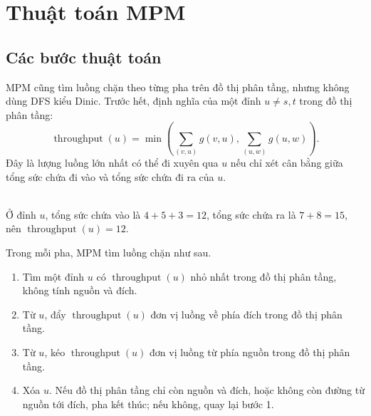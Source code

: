 \documentclass[11pt]{article}
\newcommand{\throughput}{\operatorname{throughput}}
\begin{document}
\section{Thuật toán MPM}

\subsection{Các bước thuật toán}

MPM cũng tìm luồng chặn theo từng pha trên đồ thị phân tầng, nhưng không dùng
DFS kiểu Dinic. Trước hết, định nghĩa  của một đỉnh
\(u\ne s,t\) trong đồ thị phân tầng:
\[
  \throughput(u)=
  \min\left(
    \sum_{(v,u)} g(v,u),
    \sum_{(u,w)} g(u,w)
  \right).
\]
Đây là lượng luồng lớn nhất có thể đi xuyên qua \(u\) nếu chỉ xét cân bằng
giữa tổng sức chứa đi vào và tổng sức chứa đi ra của \(u\).

\begin{center}
\\
\small Ở đỉnh \(u\), tổng sức chứa vào là \(4+5+3=12\), tổng sức chứa ra là
\(7+8=15\), nên \(\throughput(u)=12\).
\end{center}

Trong mỗi pha, MPM tìm luồng chặn như sau.
\begin{enumerate}
  \item Tìm một đỉnh \(u\) có \(\throughput(u)\) nhỏ nhất trong đồ thị phân
  tầng, không tính nguồn và đích.
  \item Từ \(u\), đẩy \(\throughput(u)\) đơn vị luồng về phía đích trong đồ
  thị phân tầng.
  \item Từ \(u\), kéo \(\throughput(u)\) đơn vị luồng từ phía nguồn trong đồ
  thị phân tầng.
  \item Xóa \(u\). Nếu đồ thị phân tầng chỉ còn nguồn và đích, hoặc không còn
  đường từ nguồn tới đích, pha kết thúc; nếu không, quay lại bước 1.
\end{enumerate}
\end{document}
